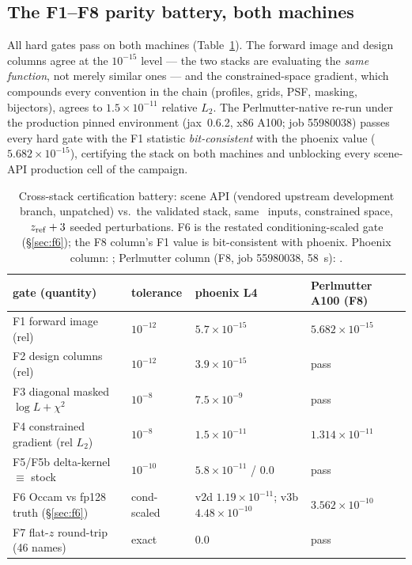 \subsection{The F1--F8 parity battery, both machines}
\label{sec:parity}

All hard gates pass on both machines
(Table~\ref{tab:parity}). The
forward image and design columns agree at the $10^{-15}$ level --- the two
stacks are evaluating the \emph{same function}, not merely similar ones ---
and the constrained-space gradient, which compounds every convention in the
chain (profiles, grids, PSF, masking, bijectors), agrees to
$1.5\times10^{-11}$ relative $L_2$. The Perlmutter-native re-run under the
production pinned environment (jax~0.6.2, x86 A100; job 55980038) passes
every hard gate with the F1 statistic \emph{bit-consistent} with the phoenix
value ($5.682\times10^{-15}$), certifying the stack on both machines and
unblocking every scene-API production cell of the campaign.

\begin{table}[htbp]
\centering
\caption{Cross-stack certification battery: scene API (vendored upstream
development branch, unpatched) vs.\ the validated  stack, same
\foundry\ inputs, constrained space, $z_{\rm ref}+3$ seeded perturbations.
F6 is the restated conditioning-scaled gate (\S\ref{sec:f6}); the F8
column's F1 value is bit-consistent with phoenix. Phoenix column:
; Perlmutter column (F8, job 55980038,
58~s): .}
\label{tab:parity}
\footnotesize
\begin{tabular}{llll}
\toprule
gate (quantity) & tolerance & phoenix L4 & Perlmutter A100 (F8) \\
\midrule
F1 forward image (rel) & $10^{-12}$ & $5.7\times10^{-15}$ & $5.682\times10^{-15}$ \\
F2 design columns (rel) & $10^{-12}$ & $3.9\times10^{-15}$ & pass \\
F3 diagonal masked $\log L+\chi^2$ & $10^{-8}$ & $7.5\times10^{-9}$ & pass \\
F4 constrained gradient (rel $L_2$) & $10^{-8}$ & $1.5\times10^{-11}$ & $1.314\times10^{-11}$ \\
F5/F5b delta-kernel $\equiv$ stock & $10^{-10}$ & $5.8\times10^{-11}$ / $0.0$ & pass \\
F6 Occam vs fp128 truth (\S\ref{sec:f6}) & cond-scaled & v2d $1.19\times10^{-11}$; v3b $4.48\times10^{-10}$ & $3.562\times10^{-10}$ \\
F7 flat-$z$ round-trip (46 names) & exact & $0.0$ & pass \\
\bottomrule
\end{tabular}
\end{table}

